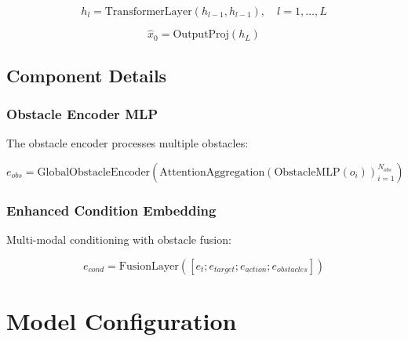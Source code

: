 \documentclass[12pt]{article}
\begin{document}
\begin{equation}
h_l = \text{TransformerLayer}(h_{l-1}, h_{l-1}), \quad l=1,\dots,L
\end{equation}

\begin{equation}
\hat{x}_0 = \text{OutputProj}(h_L)
\end{equation}

\subsection{Component Details}

\subsubsection{Obstacle Encoder MLP}

The obstacle encoder processes multiple obstacles:

\begin{equation}
e_{obs} = \text{GlobalObstacleEncoder}\left(\text{AttentionAggregation}\left(\text{ObstacleMLP}(o_i)\right)_{i=1}^{N_{obs}}\right)
\end{equation}

\subsubsection{Enhanced Condition Embedding}

Multi-modal conditioning with obstacle fusion:

\begin{equation}
e_{cond} = \text{FusionLayer}([e_t; e_{target}; e_{action}; e_{obstacles}])
\end{equation}

\section{Model Configuration}
\end{document}

